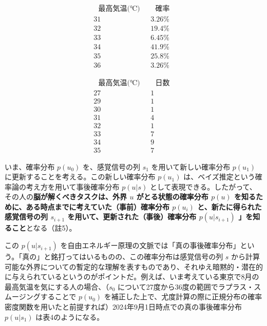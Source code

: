 \[
\begin{array}{cc}
~~~\textrm{最高気温(℃)}~~~ & ~~~\textrm{確率}~~~ \\
\hline
\textrm{31} & \textrm{3.26\%} \\
\textrm{32} & \textrm{19.4\%} \\
\textrm{33} & \textrm{6.45\%} \\
\textrm{34} & \textrm{41.9\%} \\
\textrm{35} & \textrm{25.8\%} \\
\textrm{36} & \textrm{3.26\%}
\end{array}
\tag{表2}
\]

\[
\begin{array}{cc}
~~~\textrm{最高気温(℃)}~~~ & ~~~\textrm{日数}~~~ \\
\hline
\textrm{27} & \textrm{1} \\
\textrm{29} & \textrm{1} \\
\textrm{30} & \textrm{1} \\
\textrm{31} & \textrm{4} \\
\textrm{32} & \textrm{1} \\
\textrm{33} & \textrm{7} \\
\textrm{34} & \textrm{9} \\
\textrm{35} & \textrm{7}
\end{array}
\tag{表3}
\]

いま、確率分布 \(p(u_0)\) を、感覚信号の列 \(s_1\)
を用いて新しい確率分布 \(p(u_1)\)
に更新することを考える。この新しい確率分布 \(p(u_1)\)
は、ベイズ推定という確率論の考え方を用いて事後確率分布 \(p(u|s)\)
として表現できる。したがって、その人の\textbf{脳が解くべきタスクは、外界
\(u\) がとる状態の確率分布 \(p(u)\)
を知るために、ある時点までに考えていた（事前）確率分布 \(p(u_i)\)
と、新たに得られた感覚信号の列 \(s_{i+1}\)
を用いて、更新された（事後）確率分布 \(p(u|s_{i+1})\)
」を知ること}となる（註5）。

この \(p(u|s_{i+1})\)
を自由エネルギー原理の文脈では「真の事後確率分布」という。「真の」と銘打ってはいるものの、この確率分布は感覚信号の列
\(s\)
から計算可能な外界についての暫定的な理解を表すものであり、それゆえ暗黙的・潜在的に与えられているというのがポイントだ。例えば、いま考えている東京で8月の最高気温を気にする人の場合、（\(s_0\)
について27度から36度の範囲でラプラス・スムージングすることで \(p(u_0)\)
を補正した上で、尤度計算の際に正規分布の確率密度関数を用いたと前提すれば）2024年9月1日時点での真の事後確率分布
\(p(u|s_1)\) は表4のようになる。

